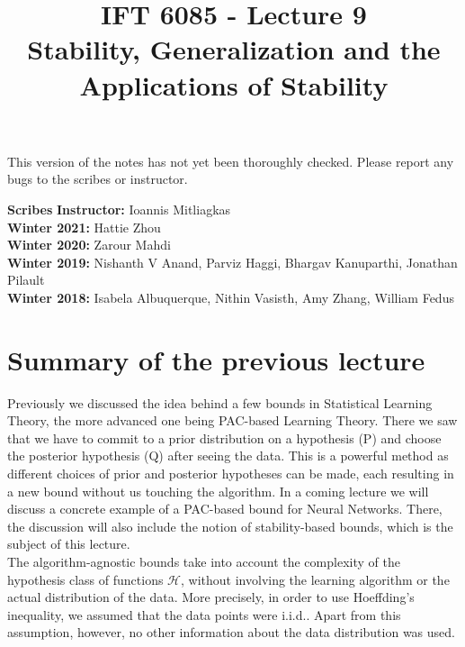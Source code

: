 \documentclass{article}
\title{IFT 6085 - Lecture 9 \\ Stability, Generalization and the Applications of Stability}
\date{}
\begin{document}
 

\maketitle

\vspace{-0.5in}
\begin{center}
This version of the notes has not yet been thoroughly checked.
Please report any bugs to the scribes or instructor.
\end{center}
\vspace{0.2in}

\textbf{Scribes}\hfill
\textbf{Instructor:}  Ioannis Mitliagkas\\
\textbf{Winter 2021:} Hattie Zhou\\
\textbf{Winter 2020:} Zarour Mahdi\\
\textbf{Winter 2019:} Nishanth V Anand, Parviz Haggi,
Bhargav Kanuparthi, Jonathan Pilault\\
\textbf{Winter 2018:} Isabela Albuquerque, Nithin Vasisth, Amy Zhang, William Fedus



\newcommand{\infgc}{\inf_{g \in \mathcal{C}}}
\newcommand{\supgc}{\sup_{g \in \mathcal{C}}}

\newcommand{\Prob}{\mathbb{P}}
\newcommand{\E}{\mathbb{E}}
\newcommand{\reals}{\mathbb{R}}

\section{Summary of the previous lecture}
Previously we discussed the idea behind a few bounds in Statistical Learning Theory, the more advanced one being PAC-based Learning Theory. There we saw that we have to commit to a prior distribution on a hypothesis (P) and choose the posterior hypothesis (Q) after seeing the data. This is a powerful method as different choices of prior and posterior hypotheses can be made, each resulting in a new bound without us touching the algorithm. 
In a coming lecture we will discuss a concrete example of a PAC-based bound for Neural Networks. There, the discussion will also include the notion of stability-based bounds, which is the subject of this lecture.\\


The algorithm-agnostic bounds take into account the complexity of the hypothesis class of functions $\mathcal{H}$, without involving the learning algorithm or the actual distribution of the data. More precisely, in order to use Hoeffding's inequality, we assumed that the data points were i.i.d.. Apart from this assumption, however, no other information about the data distribution was used. \\
\end{document}
